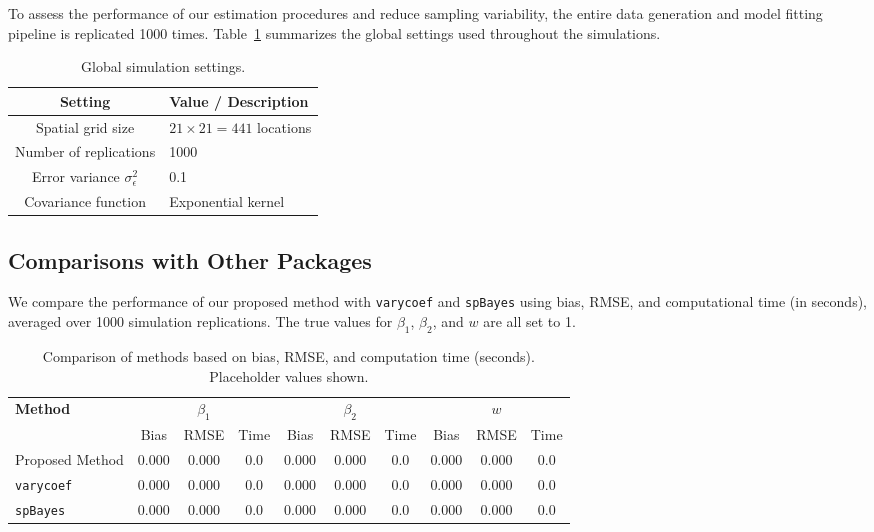 To assess the performance of our estimation procedures and reduce sampling variability, the entire data generation and model fitting pipeline is replicated 1000 times. Table~\ref{tab:settings} summarizes the global settings used throughout the simulations.

\begin{table}[h!]
\centering
\caption{Global simulation settings.}
\label{tab:settings}
\begin{tabular}{|c|l|}
\hline
\textbf{Setting} & \textbf{Value / Description} \\
\hline
Spatial grid size & \( 21 \times 21 = 441 \) locations \\
Number of replications & 1000 \\
Error variance \( \sigma^2_\epsilon \) & 0.1 \\
Covariance function & Exponential kernel \\
\hline
\end{tabular}
\end{table}

\subsection{Comparisons with Other Packages}

We compare the performance of our proposed method with \texttt{varycoef} and \texttt{spBayes} using bias, RMSE, and computational time (in seconds), averaged over 1000 simulation replications. The true values for \( \beta_1 \), \( \beta_2 \), and \( w \) are all set to 1.

\begin{table}[h!]
\centering
\caption{Comparison of methods based on bias, RMSE, and computation time (seconds). Placeholder values shown.}
\label{tab:method-compact}
\begin{tabular}{|l|ccc|ccc|ccc|}
\hline
\textbf{Method} 
& \multicolumn{3}{c|}{\( \beta_1 \)} 
& \multicolumn{3}{c|}{\( \beta_2 \)} 
& \multicolumn{3}{c|}{\( w \)} \\
\cline{2-10}
& Bias & RMSE & Time 
& Bias & RMSE & Time 
& Bias & RMSE & Time \\
\hline
Proposed Method 
& 0.000 & 0.000 & 0.0 
& 0.000 & 0.000 & 0.0 
& 0.000 & 0.000 & 0.0 \\
\texttt{varycoef} 
& 0.000 & 0.000 & 0.0 
& 0.000 & 0.000 & 0.0 
& 0.000 & 0.000 & 0.0 \\
\texttt{spBayes} 
& 0.000 & 0.000 & 0.0 
& 0.000 & 0.000 & 0.0 
& 0.000 & 0.000 & 0.0 \\
\hline
\end{tabular}
\end{table}

